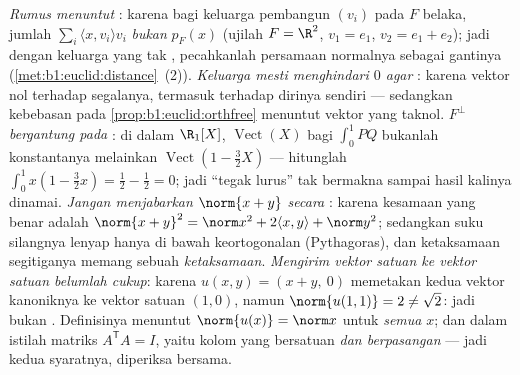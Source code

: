 \begin{remark}
\label{rem:b1:euclid:pitfalls}
\emph{Rumus  menuntut  }: karena bagi
keluarga pembangun $(v_i)$ pada $F$ belaka, jumlah $\sum_i\langle
x, v_i\rangle v_i$ \emph{bukan} $p_F(x)$ (ujilah $F = \R^2$, $v_1
= e_1$, $v_2 = e_1 + e_2$); jadi dengan keluarga yang tak , pecahkanlah
persamaan normalnya sebagai gantinya
(\cref{met:b1:euclid:distance}~(2)).
\emph{Keluarga  mesti menghindari $0$ agar }: karena vektor
nol  terhadap segalanya, termasuk terhadap dirinya sendiri ---
sedangkan kebebasan pada \cref{prop:b1:euclid:orthfree} menuntut vektor
yang taknol.
\emph{$F^\perp$ bergantung pada }: di dalam $\R_1[X]$,
 $\operatorname{Vect}(X)$ bagi $\int_0^1 PQ$ bukanlah
konstantanya melainkan $\operatorname{Vect}(1 - \frac32 X)$ ---
hitunglah $\int_0^1 x(1 - \frac32 x) = \frac12 - \frac12 = 0$;
jadi ``tegak lurus'' tak bermakna sampai hasil kalinya dinamai.
\emph{Jangan menjabarkan $\norm{x + y}$ secara }: karena kesamaan
yang benar adalah $\norm{x+y}^2 = \norm x^2 + 2\langle x, y\rangle +
\norm y^2$; sedangkan suku silangnya lenyap hanya di bawah keortogonalan
(Pythagoras), dan ketaksamaan segitiganya memang sebuah
\emph{ketaksamaan}.
\emph{Mengirim vektor satuan ke vektor satuan belumlah cukup}: karena $u(x,
y) = (x + y,\ 0)$ memetakan kedua vektor  kanoniknya ke vektor
satuan $(1, 0)$, namun $\norm{u(1,1)} = 2 \neq \sqrt2$: jadi bukan
. Definisinya menuntut $\norm{u(x)} = \norm x$ untuk
\emph{semua} $x$; dan dalam istilah matriks $A^{\mathsf T}A = I$, yaitu
kolom yang bersatuan \emph{dan  berpasangan} --- jadi kedua
syaratnya, diperiksa bersama.
\end{remark}

